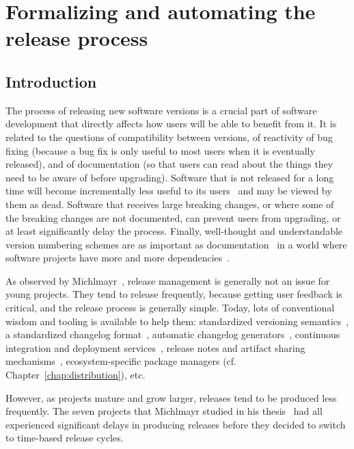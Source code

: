 \chapter{Formalizing and automating the release process}

\label{chap:release}

\section{Introduction}

The process of releasing new software versions is a crucial part of software development that directly affects how users will be able to benefit from it.
It is related to the questions of compatibility between versions, of reactivity of bug fixing (because a bug fix is only useful to most users when it is eventually released), and of documentation (so that users can read about the things they need to be aware of before upgrading).
Software that is not released for a long time will become incrementally less useful to its users~\cite{lehman1996laws} and may be viewed by them as dead.
Software that receives large breaking changes, or where some of the breaking changes are not documented, can prevent users from upgrading, or at least significantly delay the process.
Finally, well-thought and understandable version numbering schemes are as important as documentation~\cite[Chapter~7]{fogel2005producing} in a world where software projects have more and more dependencies~\cite{decan2019empirical}.

As observed by Michlmayr~\cite{michlmayr2007thesis}, release management is generally not an issue for young projects.
They tend to release frequently, because getting user feedback is critical, and the release process is generally simple.
Today, lots of conventional wisdom and tooling is available to help them: standardized versioning semantics~\cite{preston_semantic_versioning}, a standardized changelog format~\cite{keep_a_changelog}, automatic changelog generators~\cite{conventional_changelog}, continuous integration and deployment services~\cite{appveyor,azure_pipelines,circleci,gitlab,travisci}, release notes and artifact sharing mechanisms~\cite{github_releases}, ecosystem-specific package managers (cf. Chapter~\ref{chap:distribution}), etc.

However, as projects mature and grow larger, releases tend to be produced less frequently.
The seven projects that Michlmayr studied in his thesis~\cite{michlmayr2007thesis} had all experienced significant delays in producing releases before they decided to switch to time-based release cycles.

